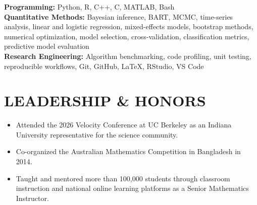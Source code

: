 \documentclass[10pt,letterpaper]{article}
\newenvironment{resumeItems}{%
	\begin{itemize}[
		label=\textbullet,
		leftmargin=14pt,
		labelsep=5pt,
		itemsep=0.5pt,
		topsep=1.0pt,
		parsep=0pt,
		partopsep=0pt
	]
}{\end{itemize}}
\begin{document}
\textbf{Programming:} Python, R, C++, C, MATLAB, Bash\\
\textbf{Quantitative Methods:} Bayesian inference, BART, MCMC, time-series analysis, linear and logistic regression, mixed-effects models, bootstrap methods, numerical optimization, model selection, cross-validation, classification metrics, predictive model evaluation\\
\textbf{Research Engineering:} Algorithm benchmarking, code profiling, unit testing, reproducible workflows, Git, GitHub, LaTeX, RStudio, VS Code

\section*{LEADERSHIP \& HONORS}

\begin{resumeItems}
	\item Attended the 2026 Velocity Conference at UC Berkeley as an Indiana University representative for the science community.
	\item Co-organized the Australian Mathematics Competition in Bangladesh in 2014.
	\item Taught and mentored more than 100,000 students through classroom instruction and national online learning platforms as a Senior Mathematics Instructor.
\end{resumeItems}
\end{document}
